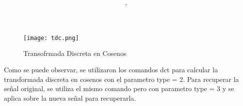 \documentclass{article}
\author{\nombre , \carnet}
\title{\textbf{\Huge\titulo}}
\begin{document}
\maketitle

\begin{figure}[h]
        \texttt{[image: tdc.png]}
                 \caption{Transofrmada Discreta en Cosenos}
\end{figure}	
Como se puede observar, se utilizaron los comandos dct para calcular
la transformada discreta en cosenos con el parametro type = 2.
Para recuperar la señal original, se utiliza el mismo comando
pero con parametro type = 3 y se aplica sobre la nueva señal para 
recuperarla. 
\end{document}
